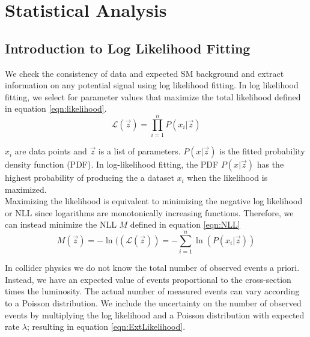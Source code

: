 \chapter{Statistical Analysis}
\label{chap:statistics}

\section{Introduction to Log Likelihood Fitting}
\label{sec:stat:likelihood}

\indent We check the consistency of data and expected SM background and extract information on any potential signal using log likelihood fitting.  In log likelihood fitting, we select for parameter values that maximize the total likelihood defined in equation \ref{eqn:likelihood}.  \\

\begin{equation}
\label{eqn:likelihood}
{\mathcal{L}}(\vec{z}) = {\displaystyle\prod_{i=1}^{n}} P(x_i|\vec{z})
\end{equation}

\indent $x_i$ are data points and $\vec{z}$ is a list of parameters. $P(x|\vec{z})$ is the fitted probability density function (PDF).  In log-likelihood fitting, the PDF $P(x|\vec{z})$ has the highest probability of producing the a dataset $x_i$ when the likelihood is maximized. \\

\indent Maximizing the likelihood is equivalent to minimizing the negative log likelihood or NLL since logarithms are monotonically increasing functions.  Therefore, we can instead minimize the NLL $M$ defined in equation \ref{eqn:NLL} \\

\begin{equation}
\label{eqn:NLL}
M(\vec{z})=-\ln(({\mathcal{L}}(\vec{z})) = -{\displaystyle\sum_{i=1}^{n}} \ln( P(x_i|\vec{z}) )
\end{equation}

\indent In collider physics we do not know the total number of observed events a priori.  Instead, we have an expected value of events proportional to the cross-section times the luminosity.  The actual number of measured events can vary according to a Poisson distribution.  We include the uncertainty on the number of observed events by multiplying the log likelihood and a Poisson distribution with expected rate $\lambda$; resulting in equation \ref{eqn:ExtLikelihood}.  \\

